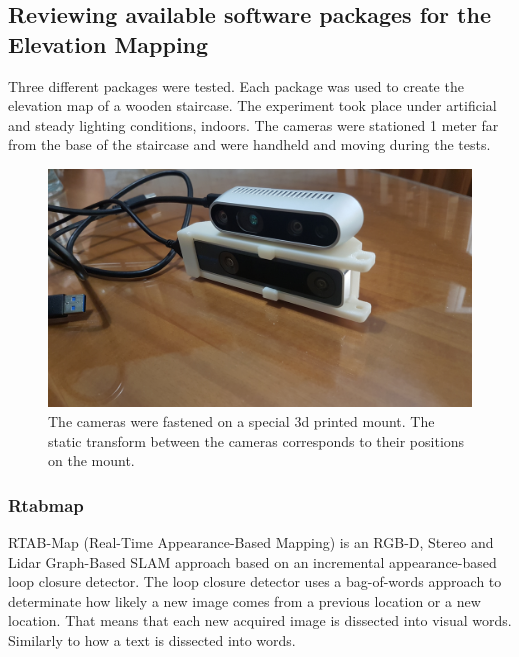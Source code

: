 \documentclass{article}
\begin{document}
\clearpage

\subsection{Reviewing available software packages for the Elevation Mapping}

Three different packages were tested. Each package was used to create the elevation map of a wooden staircase. The experiment took place under artificial and steady lighting conditions, indoors. The cameras were stationed 1 meter far from the base of the staircase and were handheld and moving during the tests. 

\begin{figure}[h] %
    \centering
	\includegraphics[width=\textwidth,height=\textheight,keepaspectratio]{report1-img010.jpg} %
	\caption{The cameras were fastened on a special 3d printed mount. The static transform between the cameras corresponds to their positions on the mount.}
\end{figure}

\subsubsection{Rtabmap}

RTAB-Map (Real-Time Appearance-Based Mapping) is an RGB-D, Stereo and Lidar Graph-Based SLAM approach based on an incremental appearance-based loop closure detector. The loop closure detector uses a bag-of-words approach to determinate how likely a new image comes from a previous location or a new location. That means that each new acquired image is dissected into visual words. Similarly to how a text is dissected into words. 
\end{document}
